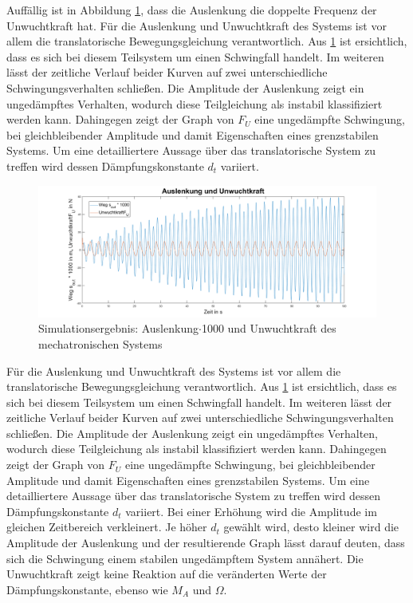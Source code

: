 Auffällig ist in Abbildung \ref{fig:StreckeundUnwuchtkraft}, dass die Auslenkung die doppelte Frequenz der Unwuchtkraft hat.
Für die Auslenkung und Unwuchtkraft des Systems ist vor allem die translatorische Bewegungsgleichung verantwortlich. Aus \ref{fig:StreckeundUnwuchtkraft} ist ersichtlich, dass es sich bei diesem Teilsystem um einen Schwingfall handelt. Im weiteren lässt der zeitliche Verlauf beider Kurven auf zwei unterschiedliche Schwingungsverhalten schließen. Die Amplitude der Auslenkung zeigt ein ungedämpftes Verhalten, wodurch diese Teilgleichung als instabil klassifiziert werden kann. Dahingegen zeigt der Graph von $F_U$ eine ungedämpfte Schwingung, bei gleichbleibender Amplitude und damit Eigenschaften eines grenzstabilen Systems. Um eine detailliertere Aussage über das translatorische System zu treffen wird dessen Dämpfungskonstante $d_t$ variiert.
\begin{figure}[hbt]
	\centering
	\includegraphics[width=1\linewidth]{Images/StreckeundUnwuchtkraft}
	\caption{Simulationsergebnis: Auslenkung$\cdot$1000 und Unwuchtkraft des mechatronischen Systems}
	\label{fig:StreckeundUnwuchtkraft}
\end{figure}
Für die Auslenkung und Unwuchtkraft des Systems ist vor allem die translatorische Bewegungsgleichung verantwortlich. Aus \ref{fig:StreckeundUnwuchtkraft} ist ersichtlich, dass es sich bei diesem Teilsystem um einen Schwingfall handelt. Im weiteren lässt der zeitliche Verlauf beider Kurven auf zwei unterschiedliche Schwingungsverhalten schließen. Die Amplitude der Auslenkung zeigt ein ungedämpftes Verhalten, wodurch diese Teilgleichung als instabil klassifiziert werden kann. Dahingegen zeigt der Graph von $F_U$ eine ungedämpfte Schwingung, bei gleichbleibender Amplitude und damit Eigenschaften eines grenzstabilen Systems. Um eine detailliertere Aussage über das translatorische System zu treffen wird dessen Dämpfungskonstante $d_t$ variiert.
Bei einer Erhöhung wird die Amplitude im gleichen Zeitbereich verkleinert. Je höher $d_t$ gewählt wird, desto kleiner wird die Amplitude der Auslenkung und der resultierende Graph lässt darauf deuten, dass sich die Schwingung einem stabilen ungedämpftem System annähert. Die Unwuchtkraft zeigt keine Reaktion auf die veränderten Werte der Dämpfungskonstante, ebenso wie $M_A$ und $\Omega$. \\

